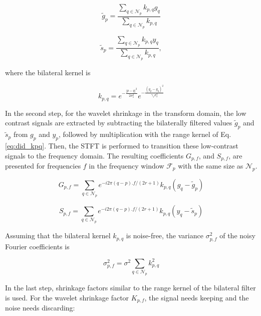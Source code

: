 \begin{equation}
\label{eq:did_gp}
\tilde{g}_{p}=\frac{\sum_{q\in \mathscr{N}_{p}}{k_{p,q}g_{q}}}{\sum_{q\in \mathscr{N}_{p}}{k_{p,q}}}
\end{equation}

\begin{equation}
\label{eq:did_sp}
\tilde{s}_{p}=\frac{\sum_{q\in \mathscr{N}_{p}}{k_{p,q}y_{q}}}{\sum_{q\in \mathscr{N}_{p}}{k_{p,q}}},
\end{equation}

where the bilateral kernel is

\begin{equation}
\label{eq:did_kpq}
k_{p,q}=e^{-\frac{\left| p-q\right|^2}{2\sigma_{s}^2}}e^{-\frac{\left( g_{p}-g_{q}\right)^2}{\gamma_{r}\sigma_{s}^2}}
\end{equation}

In the second step, for the wavelet shrinkage in the transform domain, the low contrast signals are extracted by subtracting the bilaterally filtered values $\tilde{g}_{p}$ and $\tilde{s}_{p}$ from $g_{p}$ and $y_{p}$, followed by multiplication with the range kernel of Eq. \ref{eq:did_kpq}. Then, the STFT is performed to transition these low-contrast signals to the frequency domain. The resulting coefficients $G_{p,f}$, and $S_{p,f}$, are presented for frequencies $f$ in the frequency window $\mathscr{F}_{p}$ with the same size as $\mathscr{N}_{p}$.

\begin{equation}
\label{eq:did_gpf}
G_{p,f}=\sum_{q\in \mathscr{N}_{p}}{e^{-i2\pi\left( q-p \right).f/\left( 2r+1 \right)}k_{p,q}\left( g_{q}-\tilde{g}_{p}\right)}
\end{equation}

\begin{equation}
\label{eq:did_sspf}
S_{p,f}=\sum_{q\in \mathscr{N}_{p}}{e^{-i2\pi\left( q-p \right).f/\left( 2r+1 \right)}k_{p,q}\left( y_{q}-\tilde{s}_{p}\right)}
\end{equation}

Assuming that the bilateral kernel $k_{p,q}$  is noise-free, the variance $\sigma_{p,f}^2$ of the noisy Fourier coefficients is

\begin{equation}
\label{eq:did_spf}
\sigma_{p,f}^2=\sigma^2\sum_{q\in \mathscr{N}_{p}}{k_{p,q}^2}
\end{equation}

In the last step, shrinkage factors similar to the range kernel of the bilateral filter is used. For the wavelet shrinkage factor $K_{p,f}$, the signal needs keeping and the noise needs discarding:

